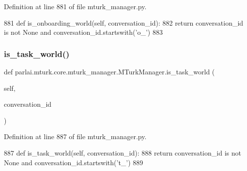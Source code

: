 Definition at line 881 of file mturk\+\_\+manager.\+py.


\begin{DoxyCode}
881     \textcolor{keyword}{def }is\_onboarding\_world(self, conversation\_id):
882         \textcolor{keywordflow}{return} conversation\_id \textcolor{keywordflow}{is} \textcolor{keywordflow}{not} \textcolor{keywordtype}{None} \textcolor{keywordflow}{and} conversation\_id.startswith(\textcolor{stringliteral}{'o\_'})
883 
\end{DoxyCode}
\mbox{\label{classparlai_1_1mturk_1_1core_1_1mturk__manager_1_1MTurkManager_a1c840892de0be91505aaed2ba01dfafe}} 
\subsubsection{\texorpdfstring{is\+\_\+task\+\_\+world()}{is\_task\_world()}}
{\footnotesize\ttfamily def parlai.\+mturk.\+core.\+mturk\+\_\+manager.\+M\+Turk\+Manager.\+is\+\_\+task\+\_\+world (\begin{DoxyParamCaption}\item[{}]{self,  }\item[{}]{conversation\+\_\+id }\end{DoxyParamCaption})}



Definition at line 887 of file mturk\+\_\+manager.\+py.


\begin{DoxyCode}
887     \textcolor{keyword}{def }is\_task\_world(self, conversation\_id):
888         \textcolor{keywordflow}{return} conversation\_id \textcolor{keywordflow}{is} \textcolor{keywordflow}{not} \textcolor{keywordtype}{None} \textcolor{keywordflow}{and} conversation\_id.startswith(\textcolor{stringliteral}{'t\_'})
889 
\end{DoxyCode}
\mbox{\label{classparlai_1_1mturk_1_1core_1_1mturk__manager_1_1MTurkManager_a09d491450292c9ce3da629fab48dda54}} 
